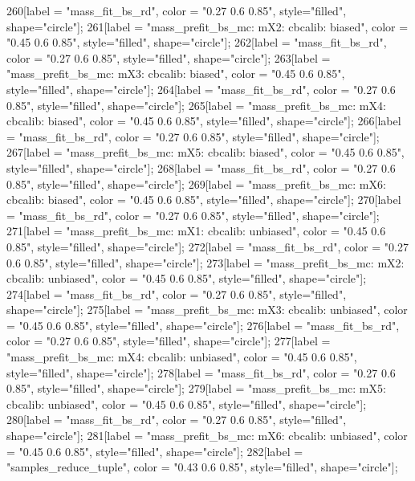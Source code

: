 {	260[label = "mass_fit_bs_rd", color = "0.27 0.6 0.85", style="filled", shape="circle"];
	261[label = "mass_prefit_bs_mc\nmassbin: mX2\nmassmodel: cbcalib\ntrigger: biased", color = "0.45 0.6 0.85", style="filled", shape="circle"];
	262[label = "mass_fit_bs_rd", color = "0.27 0.6 0.85", style="filled", shape="circle"];
	263[label = "mass_prefit_bs_mc\nmassbin: mX3\nmassmodel: cbcalib\ntrigger: biased", color = "0.45 0.6 0.85", style="filled", shape="circle"];
	264[label = "mass_fit_bs_rd", color = "0.27 0.6 0.85", style="filled", shape="circle"];
	265[label = "mass_prefit_bs_mc\nmassbin: mX4\nmassmodel: cbcalib\ntrigger: biased", color = "0.45 0.6 0.85", style="filled", shape="circle"];
	266[label = "mass_fit_bs_rd", color = "0.27 0.6 0.85", style="filled", shape="circle"];
	267[label = "mass_prefit_bs_mc\nmassbin: mX5\nmassmodel: cbcalib\ntrigger: biased", color = "0.45 0.6 0.85", style="filled", shape="circle"];
	268[label = "mass_fit_bs_rd", color = "0.27 0.6 0.85", style="filled", shape="circle"];
	269[label = "mass_prefit_bs_mc\nmassbin: mX6\nmassmodel: cbcalib\ntrigger: biased", color = "0.45 0.6 0.85", style="filled", shape="circle"];
	270[label = "mass_fit_bs_rd", color = "0.27 0.6 0.85", style="filled", shape="circle"];
	271[label = "mass_prefit_bs_mc\nmassbin: mX1\nmassmodel: cbcalib\ntrigger: unbiased", color = "0.45 0.6 0.85", style="filled", shape="circle"];
	272[label = "mass_fit_bs_rd", color = "0.27 0.6 0.85", style="filled", shape="circle"];
	273[label = "mass_prefit_bs_mc\nmassbin: mX2\nmassmodel: cbcalib\ntrigger: unbiased", color = "0.45 0.6 0.85", style="filled", shape="circle"];
	274[label = "mass_fit_bs_rd", color = "0.27 0.6 0.85", style="filled", shape="circle"];
	275[label = "mass_prefit_bs_mc\nmassbin: mX3\nmassmodel: cbcalib\ntrigger: unbiased", color = "0.45 0.6 0.85", style="filled", shape="circle"];
	276[label = "mass_fit_bs_rd", color = "0.27 0.6 0.85", style="filled", shape="circle"];
	277[label = "mass_prefit_bs_mc\nmassbin: mX4\nmassmodel: cbcalib\ntrigger: unbiased", color = "0.45 0.6 0.85", style="filled", shape="circle"];
	278[label = "mass_fit_bs_rd", color = "0.27 0.6 0.85", style="filled", shape="circle"];
	279[label = "mass_prefit_bs_mc\nmassbin: mX5\nmassmodel: cbcalib\ntrigger: unbiased", color = "0.45 0.6 0.85", style="filled", shape="circle"];
	280[label = "mass_fit_bs_rd", color = "0.27 0.6 0.85", style="filled", shape="circle"];
	281[label = "mass_prefit_bs_mc\nmassbin: mX6\nmassmodel: cbcalib\ntrigger: unbiased", color = "0.45 0.6 0.85", style="filled", shape="circle"];
	282[label = "samples_reduce_tuple", color = "0.43 0.6 0.85", style="filled", shape="circle"];
}

